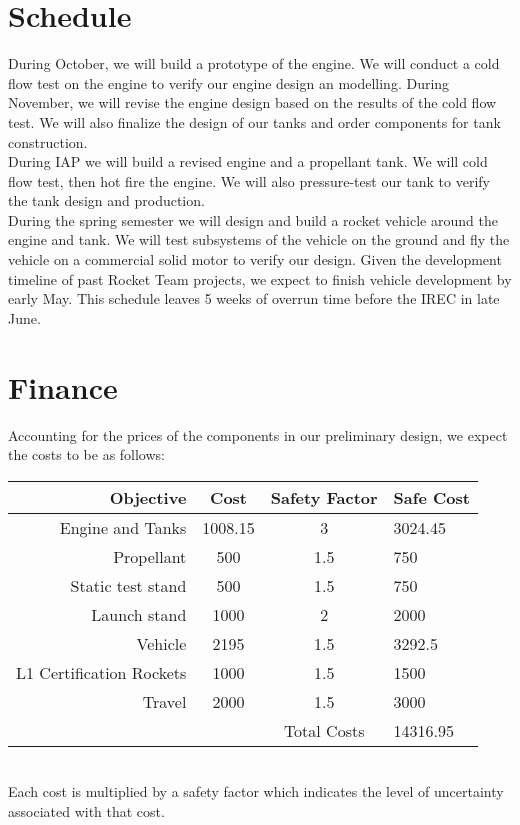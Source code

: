 \documentclass{article}
\begin{document}
\section*{Schedule}
During October, we will build a prototype of the engine. We will conduct a cold flow test on the engine to verify our engine design an modelling.
During November, we will revise the engine design based on the results of the cold flow test. We will also finalize the design of our tanks and order components for tank construction.\\
During IAP we will build a revised engine and a propellant tank. We will cold flow test, then hot fire the engine. We will also pressure-test our tank to verify the tank design and production.\\
During the spring semester we will design and build a rocket vehicle around the engine and tank. We will test subsystems of the vehicle on the ground and fly the vehicle on a commercial solid motor to verify our design. Given the development timeline of past Rocket Team projects, we expect to finish vehicle development by early May. This schedule leaves 5 weeks of overrun time before the IREC in late June.


\section*{Finance}
Accounting for the prices of the components in our preliminary design, we expect the costs to be as follows:\\
\begin{tabular}{r | c | c || l}
Objective & Cost & Safety Factor & Safe Cost \\
\hline
Engine and Tanks & 1008.15 & 3 & 3024.45 \\
Propellant & 500 & 1.5 & 750 \\
Static test stand & 500 & 1.5 & 750 \\
Launch stand & 1000 & 2 & 2000 \\
Vehicle & 2195 & 1.5 & 3292.5 \\
L1 Certification Rockets & 1000 & 1.5 & 1500 \\
Travel & 2000 & 1.5 & 3000 \\
\hline
 & & Total Costs & 14316.95 \\
\end{tabular}
\\Each cost is multiplied by a safety factor which indicates the level of uncertainty associated with that cost.
\end{document}
